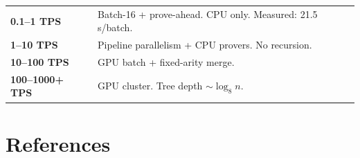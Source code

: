 \documentclass[11pt]{article}
\begin{document}
\begin{center}
\begin{tabular}{@{}ll@{}}
\toprule
\textbf{0.1--1 TPS} & Batch-16 + prove-ahead. CPU only. Measured: 21.5\,s/batch. \\
\textbf{1--10 TPS} & Pipeline parallelism + CPU provers. No recursion. \\
\textbf{10--100 TPS} & GPU batch + fixed-arity merge. \\
\textbf{100--1000+ TPS} & GPU cluster. Tree depth $\sim \log_8 n$. \\
\bottomrule
\end{tabular}
\end{center}

\section*{References}
\end{document}
